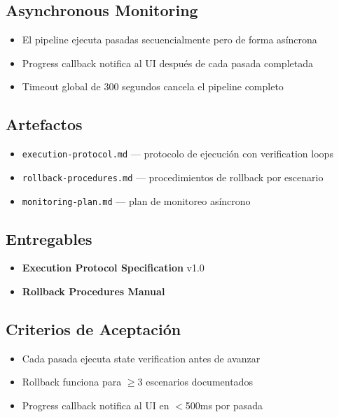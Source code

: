 \documentclass[12pt,a4paper]{article}
\begin{document}
\subsection*{Asynchronous Monitoring}
\begin{itemize}
  \item El pipeline ejecuta pasadas secuencialmente pero de forma asíncrona
  \item Progress callback notifica al UI después de cada pasada completada
  \item Timeout global de 300 segundos cancela el pipeline completo
\end{itemize}

\subsection*{Artefactos}
\begin{itemize}
  \item \texttt{execution-protocol.md} --- protocolo de ejecución con verification loops
  \item \texttt{rollback-procedures.md} --- procedimientos de rollback por escenario
  \item \texttt{monitoring-plan.md} --- plan de monitoreo asíncrono
\end{itemize}

\subsection*{Entregables}
\begin{itemize}
  \item \textbf{Execution Protocol Specification} v1.0
  \item \textbf{Rollback Procedures Manual}
\end{itemize}

\subsection*{Criterios de Aceptación}
\begin{itemize}
  \item[{${[\;]}$}] Cada pasada ejecuta state verification antes de avanzar
  \item[{${[\;]}$}] Rollback funciona para $\geq$3 escenarios documentados
  \item[{${[\;]}$}] Progress callback notifica al UI en $<$500ms por pasada
\end{itemize}

\end{document}
